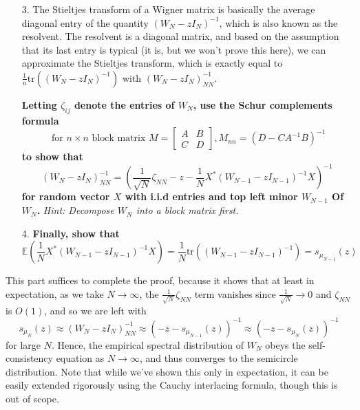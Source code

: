 \documentclass[a4paper]{article}
\begin{document}
\begin{enumerate}
    \item[3.] The Stieltjes transform of a Wigner matrix is basically the average diagonal entry of the quantity $ (W_N - z I_N)^{-1} $, which is also known as the resolvent. The resolvent is a diagonal matrix, and based on the assumption that its last entry is typical (it is, but we won't prove this here), we can approximate the Stieltjes transform, which is exactly equal to $ \frac{1}{n} \text{tr} \left( (W_N - z I_N)^{-1} \right) $ with $(W_N - z I_N)^{-1}_{NN}$.
    
    \textbf{Letting $\zeta_{ij}$ denote the entries of $ W_N $, use the Schur complements formula}
    $$ \text{ for } n \times n \text{ block matrix } M = \begin{bmatrix} A & B \\ C & D \end{bmatrix}, M_{nn} = (D - C A^{-1} B)^{-1} $$
    \textbf{to show that}
    $$(W_N - z I_N)^{-1}_{NN} = \left( \frac{1}{\sqrt{N}} \zeta_{NN} - z - \frac{1}{N} X^* (W_{N - 1} - z I_{N - 1})^{-1} X \right)^{-1}$$
    \textbf{for random vector $X$ with i.i.d entries and top left minor $W_{N - 1}$ Of $ W_N$.}
    \textit{Hint: Decompose $ W_N $ into a block matrix first.}
    
    \item[4.] \textbf{Finally, show that}
    $$ \mathbb{E} \left( \frac{1}{N} X^* (W_{N - 1} - z I_{N - 1})^{-1} X \right) = \frac{1}{N} \text{tr} \left( (W_{N - 1} - z I_{N - 1})^{-1} \right) = s_{\mu_{N - 1}}(z) $$
    
\end{enumerate}

This part suffices to complete the proof, because it shows that at least in expectation, as we take $ N \to \infty $, the $ \frac{1}{\sqrt{N}} \zeta_{NN} $ term vanishes since $ \frac{1}{\sqrt{N}} \rightarrow 0 $ and $ \zeta_{NN}$ is $ O(1) $, and so we are left with
$$ s_{\mu_N}(z) \approx (W_N - z I_N)^{-1}_{NN} \approx \left(-z - s_{\mu_{N - 1}}(z) \right)^{-1} \approx \left(-z - s_{\mu_N}(z) \right)^{-1} $$
for large $ N $. Hence, the empirical spectral distribution of $W_N$ obeys the self-consistency equation as $N \to \infty$, and thus converges to the semicircle distribution. Note that while we've shown this only in expectation, it can be easily extended rigorously using the Cauchy interlacing formula, though this is out of scope.
\end{document}
